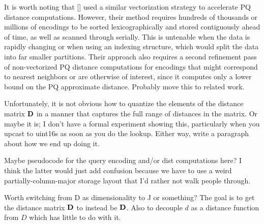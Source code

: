 It is worth noting that [] used a similar vectorization strategy to accelerate PQ distance computations. However, their method requires hundreds of thousands or millions of encodings to be sorted lexicographically and stored contiguously ahead of time, as well as scanned through serially. This is untenable when the data is rapidly changing or when using an indexing structure, which would split the data into far smaller partitions. Their approach also requires a second refinement pass of non-vectorized PQ distance computations for encodings that might correspond to nearest neighbors or are otherwise of interest, since it computes only a lower bound on the PQ approximate distance. Probably move this to related work. %

Unfortunately, it is not obvious how to quantize the elements of the distance matrix $\mathbf{D}$ in a manner that captures the full range of distances in the matrix. Or maybe it is; I don't have a formal experiment showing this, particularly when you upcast to uint16s as soon as you do the lookup. Either way, write a paragraph about how we end up doing it.

Maybe pseudocode for the query encoding and/or dist computations here? I think the latter would just add confusion because we have to use a weird partially-column-major storage layout that I'd rather not walk people through.

Worth switching from D as dimensionality to J or something? The goal is to get the distance matrix $\mathbf{D}$ to instead be $\mathbf{D}$. Also to decouple $d$ as a distance function from $D$ which has little to do with it.





